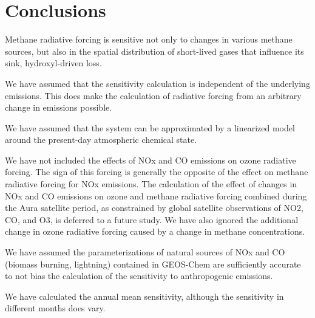 \section{Conclusions}

Methane radiative forcing is sensitive not only to changes in various methane sources, but also in the spatial distribution of short-lived gases that influence its sink, hydroxyl-driven loss.

We have assumed that the sensitivity calculation is independent of the underlying emissions. This does make the calculation of radiative forcing from an arbitrary change in emissions possible.

We have assumed that the system can be approximated by a linearized model around the present-day atmospheric chemical state.

We have not included the effects of NOx and CO emissions on ozone radiative forcing. The sign of this forcing is generally the opposite of the effect on methane radiative forcing for NOx emissions. The calculation of the effect of changes in NOx and CO emissions on ozone and methane radiative forcing combined during the Aura satellite period, as constrained by global satellite observations of NO2, CO, and O3, is deferred to a future study. We have also ignored the additional change in ozone radiative forcing caused by a change in methane concentrations.

We have assumed the parameterizations of natural sources of NOx and CO (biomass burning, lightning) contained in GEOS-Chem are sufficiently accurate to not bias the calculation of the sensitivity to anthropogenic emissions.

We have calculated the annual mean sensitivity, although the sensitivity in different months does vary.
